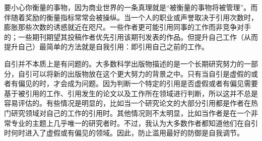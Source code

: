 要小心你衡量的事物，因为商业世界的一条真理就是“被衡量的事物将被管理”。而伴随着奖励的衡量指标常常会被操纵。当一个人的职业或声誉取决于引用次数时，膨胀那些次数的诱惑就近在咫尺。一些作者更可能引用同事的工作而非竞争对手的；一些期刊期望其投稿作者优先引用该期刊发表的作品。但提升自己工作（从而提升自己）最简单的方法就是自我引用：即引用自己之前的工作。

自引并不本质上是有问题的。大多数科学出版物描述的是一个长期研究努力的一部分，自引可以将新的出版物放在这个更大努力的背景之中。只有当自引是虚假的或者有偏见的时，才会成为问题。因为判断一个特定的引用是否虚假或者有偏见需要基于被引用的工作、引用发生的论文以及工作所在领域进行判断，所以这并不总是容易评估的。有些情况是明显的，比如当一个研究论文的大部分引用都是作者在热门研究领域对自己的工作的引用时。其他情况则不太明显，比如当作者是在一个非常专业的主题上几乎唯一的研究者时。不过，我认为大多数作者都知道他们在自引时何时进入了虚假或有偏见的领域。因此，防止滥用最好的防御是自我调节。

